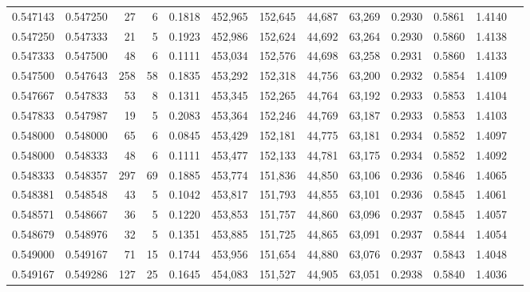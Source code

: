\begin{tabular}{rrrrrrrrrrrrr}
0.547143 & 0.547250 &    27 &   6 &                                     0.1818 & 452,965 & 152,645 &  44,687 &  63,269 & 0.2930 & 0.5861 & 1.4140 \\
0.547250 & 0.547333 &    21 &   5 &                                     0.1923 & 452,986 & 152,624 &  44,692 &  63,264 & 0.2930 & 0.5860 & 1.4138 \\
0.547333 & 0.547500 &    48 &   6 &                                     0.1111 & 453,034 & 152,576 &  44,698 &  63,258 & 0.2931 & 0.5860 & 1.4133 \\
0.547500 & 0.547643 &   258 &  58 &                                     0.1835 & 453,292 & 152,318 &  44,756 &  63,200 & 0.2932 & 0.5854 & 1.4109 \\
0.547667 & 0.547833 &    53 &   8 &                                     0.1311 & 453,345 & 152,265 &  44,764 &  63,192 & 0.2933 & 0.5853 & 1.4104 \\
0.547833 & 0.547987 &    19 &   5 &                                     0.2083 & 453,364 & 152,246 &  44,769 &  63,187 & 0.2933 & 0.5853 & 1.4103 \\
0.548000 & 0.548000 &    65 &   6 &                                     0.0845 & 453,429 & 152,181 &  44,775 &  63,181 & 0.2934 & 0.5852 & 1.4097 \\
0.548000 & 0.548333 &    48 &   6 &                                     0.1111 & 453,477 & 152,133 &  44,781 &  63,175 & 0.2934 & 0.5852 & 1.4092 \\
0.548333 & 0.548357 &   297 &  69 &                                     0.1885 & 453,774 & 151,836 &  44,850 &  63,106 & 0.2936 & 0.5846 & 1.4065 \\
0.548381 & 0.548548 &    43 &   5 &                                     0.1042 & 453,817 & 151,793 &  44,855 &  63,101 & 0.2936 & 0.5845 & 1.4061 \\
0.548571 & 0.548667 &    36 &   5 &                                     0.1220 & 453,853 & 151,757 &  44,860 &  63,096 & 0.2937 & 0.5845 & 1.4057 \\
0.548679 & 0.548976 &    32 &   5 &                                     0.1351 & 453,885 & 151,725 &  44,865 &  63,091 & 0.2937 & 0.5844 & 1.4054 \\
0.549000 & 0.549167 &    71 &  15 &                                     0.1744 & 453,956 & 151,654 &  44,880 &  63,076 & 0.2937 & 0.5843 & 1.4048 \\
0.549167 & 0.549286 &   127 &  25 &                                     0.1645 & 454,083 & 151,527 &  44,905 &  63,051 & 0.2938 & 0.5840 & 1.4036 \\

\end{tabular}
